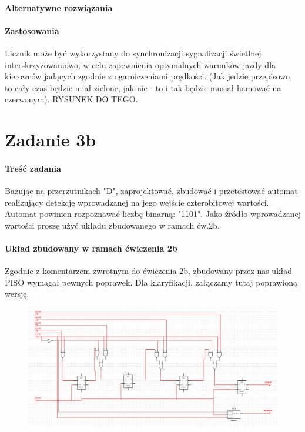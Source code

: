 \documentclass{article}
\begin{document}
\paragraph{Alternatywne rozwiązania}
\paragraph{Zastosowania}
Licznik może być wykorzystany do synchronizacji sygnalizacji świetlnej interskrzyżowaniowo, w celu zapewnienia optymalnych warunków jazdy dla kierowców jadących zgodnie z ogarniczeniami prędkości. (Jak jedzie przepisowo, to cały czas będzie miał zielone, jak nie - to i tak będzie musiał hamować na czerwonym).
RYSUNEK DO TEGO.
\section{Zadanie 3b}
\paragraph{Treść zadania}
Bazując na przerzutnikach "D", zaprojektować, zbudować i przetestować automat realizujący detekcję wprowadzanej na jego wejście czterobitowej wartości. Automat powinien rozpoznawać liczbę binarną: "1101". Jako źródło wprowadzanej wartości proszę użyć układu zbudowanego w ramach ćw.2b.
\paragraph{Układ zbudowany w ramach ćwiczenia 2b}
Zgodnie z komentarzem zwrotnym do ćwiczenia 2b, zbudowany przez nas układ PISO wymagał pewnych poprawek. Dla klaryfikacji, załączamy tutaj poprawioną wersję.
\begin{figure}[H]
\includegraphics[width = \textwidth]{3b_2b_klaryfikacja}
\end{figure}
\end{document}
